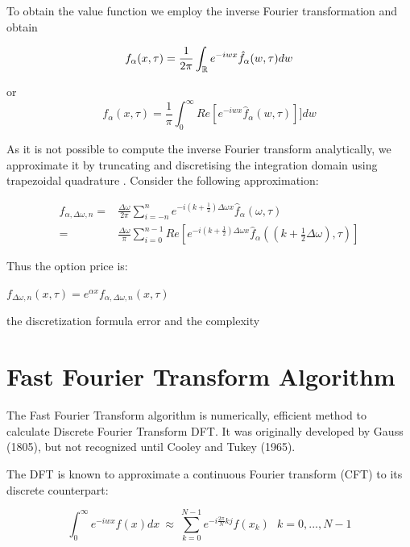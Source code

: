 \documentclass[12pt]{report}
\begin{document}
To obtain the value function we employ the inverse Fourier transformation and
obtain

\begin{equation}
f_{\alpha}(x,\tau)=\frac{1}{2\pi}\int_{\mathbb{R}} e^{-iwx}\hat{f}_{\alpha}(w,\tau) dw
\end{equation}

or 
\begin{equation}
f_{\alpha}(x,\tau)=\frac{1}{\pi}\int_{0}^{\infty} Re[e^{-iwx}\hat{f}_{\alpha}(w,\tau)] ]dw
\end{equation}


As it is not possible to compute the inverse Fourier transform analytically, we
approximate it by truncating and discretising the integration domain using trapezoidal
quadrature . Consider the following approximation:

\begin{align}
f_{\alpha,\Delta \omega, n}=&\frac{\Delta \omega}{2\pi} \sum \limits_{i=-n}^n e^{-i(k+\frac{1}{2}) \Delta \omega x }\hat{f}_{\alpha}(\omega,\tau)
\\
=& \frac{\Delta \omega}{\pi} \sum \limits_{i=0}^{n-1} Re[e^{-i(k+\frac{1}{2}) \Delta \omega x }\hat{f}_{\alpha}((k+\frac{1}{2}\Delta\omega ),\tau)]
\end{align}

Thus the option price is: 
\begin{center}

$f_{\Delta \omega, n}(x,\tau)= e^{\alpha x}f_{\alpha,\Delta \omega, n}(x,\tau)$
\end{center}
the discretization formula  error and the complexity 


\section{Fast Fourier Transform Algorithm}
The Fast Fourier Transform algorithm is numerically, efficient method to calculate Discrete Fourier Transform DFT. It was originally developed by Gauss (1805), but not recognized until Cooley and Tukey (1965).

The DFT is known to approximate a continuous Fourier transform (CFT) to its discrete counterpart:

\begin{equation}
\int_{0}^{\infty} e^{-iwx}f(x) dx ~\approx ~ \sum \limits_{k=0}^{N-1} e^{-i \frac{2\pi}{N}kj} f(x_k)~~~ k=0,...,N-1
\label{FFT}
\end{equation}
\end{document}
